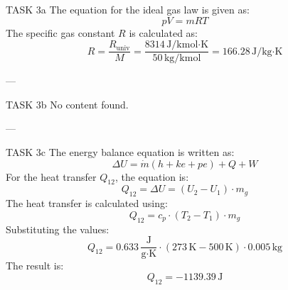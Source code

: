 TASK 3a  
The equation for the ideal gas law is given as:  
\[
pV = mRT
\]  
The specific gas constant \( R \) is calculated as:  
\[
R = \frac{R_{\text{univ}}}{M} = \frac{8314 \, \text{J/kmol·K}}{50 \, \text{kg/kmol}} = 166.28 \, \text{J/kg·K}
\]  

---

TASK 3b  
No content found.

---

TASK 3c  
The energy balance equation is written as:  
\[
\Delta U = \dot{m} \left( h + ke + pe \right) + Q + W
\]  
For the heat transfer \( Q_{12} \), the equation is:  
\[
Q_{12} = \Delta U = (U_2 - U_1) \cdot m_g
\]  
The heat transfer is calculated using:  
\[
Q_{12} = c_p \cdot (T_2 - T_1) \cdot m_g
\]  
Substituting the values:  
\[
Q_{12} = 0.633 \, \frac{\text{J}}{\text{g·K}} \cdot (273 \, \text{K} - 500 \, \text{K}) \cdot 0.005 \, \text{kg}
\]  
The result is:  
\[
Q_{12} = -1139.39 \, \text{J}
\]  

